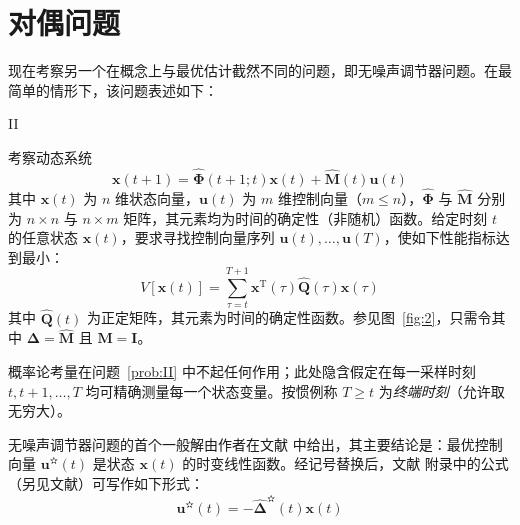 \section{对偶问题}\label{sec:dual}

现在考察另一个在概念上与最优估计截然不同的问题，即无噪声调节器问题。在最简单的情形下，该问题表述如下：

\begin{problemn}{II}\label{prob:II}

考察动态系统
\begin{equation}\label{eq:33}
\bm{x}(t + 1) = \hat{\bm{\Phi}}(t + 1; t)\bm{x}(t) + \hat{\bm{M}}(t)\bm{u}(t)
\end{equation}
其中 $\bm{x}(t)$ 为 $n$ 维状态向量，$\bm{u}(t)$ 为 $m$ 维控制向量（$m \leq n$），$\hat{\bm{\Phi}}$ 与 $\hat{\bm{M}}$ 分别为 $n \times n$ 与 $n \times m$ 矩阵，其元素均为时间的确定性（非随机）函数。给定时刻 $t$ 的任意状态 $\bm{x}(t)$，要求寻找控制向量序列 $\bm{u}(t), \dots, \bm{u}(T)$，使如下性能指标达到最小：
\begin{equation*}
V[\bm{x}(t)] = \sum_{\tau=t}^{T+1} \bm{x}^{\mathrm{T}}(\tau)\hat{\bm{Q}}(\tau)\bm{x}(\tau)
\end{equation*}
其中 $\hat{\bm{Q}}(t)$ 为正定矩阵，其元素为时间的确定性函数。参见图~\ref{fig:2}，只需令其中 $\bm{\Delta} = \hat{\bm{M}}$ 且 $\bm{M} = \bm{I}$。

\end{problemn}

概率论考量在问题~\ref{prob:II} 中不起任何作用；此处隐含假定在每一采样时刻 $t, t + 1, \dots, T$ 均可精确测量每一个状态变量。按惯例称 $T \geq t$ 为\emph{终端时刻}（允许取无穷大）。

无噪声调节器问题的首个一般解由作者在文献\cite{r18} 中给出，其主要结论是：最优控制向量 $\bm{u}^{\text{✫}}(t)$ 是状态 $\bm{x}(t)$ 的时变线性函数。经记号替换后，文献\cite{r18} 附录中的公式（另见文献\cite{r23}）可写作如下形式：
\begin{equation}\label{eq:34}
\bm{u}^{\text{✫}}(t) = -\hat{\bm{\Delta}}^{\text{✫}}(t)\bm{x}(t)
\end{equation}

